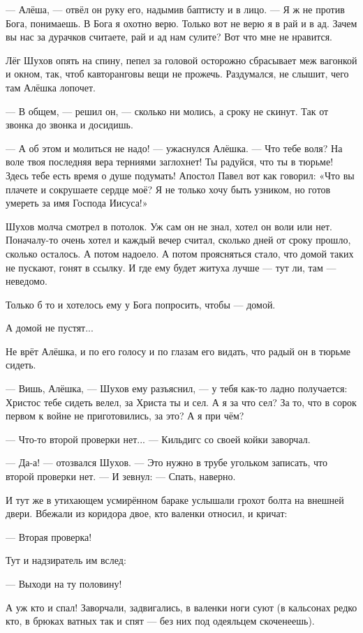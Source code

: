 --- Алёша, --- отвёл он руку его, надымив баптисту и в лицо. --- Я ж не против Бога, понимаешь. В
Бога я охотно верю. Только вот не верю я в рай и в ад. Зачем вы нас за дурачков считаете, рай и
ад нам сулите? Вот что мне не нравится.

Лёг Шухов опять на спину, пепел за головой осторожно сбрасывает меж вагонкой и окном, так,
чтоб кавторанговы вещи не прожечь. Раздумался, не слышит, чего там Алёшка лопочет.

--- В общем, --- решил он, --- сколько ни молись, а сроку не скинут. Так от звонка до звонка и
досидишь.

--- А об этом и молиться не надо! --- ужаснулся Алёшка. --- Что тебе воля? На воле твоя последняя
вера терниями заглохнет! Ты радуйся, что ты в тюрьме! Здесь тебе есть время о душе подумать!
Апостол Павел вот как говорил: «Что вы плачете и сокрушаете сердце моё? Я не только хочу быть
узником, но готов умереть за имя Господа Иисуса!»

Шухов молча смотрел в потолок. Уж сам он не знал, хотел он воли или нет. Поначалу-то очень
хотел и каждый вечер считал, сколько дней от сроку прошло, сколько осталось. А потом надоело.
А потом проясняться стало, что домой таких не пускают, гонят в ссылку. И где ему будет житуха
лучше --- тут ли, там --- неведомо.

Только б то и хотелось ему у Бога попросить, чтобы --- домой.

А домой не пустят...

Не врёт Алёшка, и по его голосу и по глазам его видать, что радый он в тюрьме сидеть.

--- Вишь, Алёшка, --- Шухов ему разъяснил, --- у тебя как-то ладно получается: Христос тебе сидеть
велел, за Христа ты и сел. А я за что сел? За то, что в сорок первом к войне не приготовились, за
это? А я при чём?

--- Что-то второй проверки нет... --- Кильдигс со своей койки заворчал.

--- Да-а! --- отозвался Шухов. --- Это нужно в трубе угольком записать, что второй проверки нет. ---
И зевнул: --- Спать, наверно.

И тут же в утихающем усмирённом бараке услышали грохот болта на внешней двери. Вбежали из
коридора двое, кто валенки относил, и кричат:

--- Вторая проверка!

Тут и надзиратель им вслед:

--- Выходи на ту половину!

А уж кто и спал! Заворчали, задвигались, в валенки ноги суют (в кальсонах редко кто, в брюках
ватных так и спят --- без них под одеяльцем скоченеешь).

